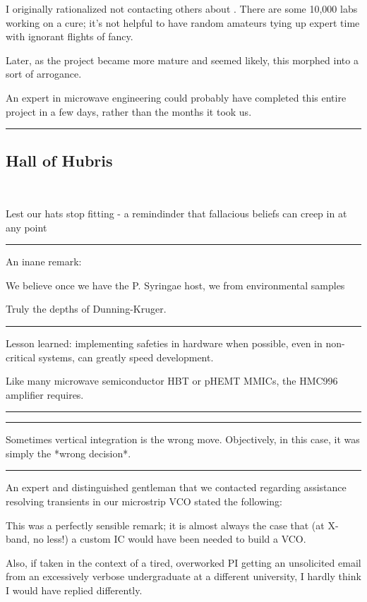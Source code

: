 \documentclass[paper.tex]{subfiles}
\begin{document}
I originally rationalized not contacting others about . There are some 10,000 labs working on a cure; it's not helpful to have random amateurs tying up expert time with ignorant flights of fancy. 

Later, as the project became more mature and seemed likely, this morphed into a sort of arrogance.

An expert in microwave engineering could probably have completed this entire project in a few days, rather than the months it took us.

\rule{\linewidth}{0.2pt}

\subsection{Hall of Hubris} \

Lest our hats stop fitting - a remindinder that fallacious beliefs can creep in at any point

\rule{\linewidth}{0.2pt}

An inane remark:

\begin{displayquote}
We believe once we have the P. Syringae host, we from environmental samples
\end{displayquote}

Truly the depths of Dunning-Kruger.

\rule{\linewidth}{0.2pt}


Lesson learned: implementing safeties in hardware when possible, even in non-critical systems, can greatly speed development.

Like many microwave semiconductor HBT or pHEMT MMICs, the HMC996 amplifier requires.

\rule{\linewidth}{0.2pt}


\rule{\linewidth}{0.2pt}

Sometimes vertical integration is the wrong move. Objectively, in this case, it was simply the *wrong decision*. 

\rule{\linewidth}{0.2pt}


An expert and distinguished gentleman that we contacted regarding assistance resolving transients in our microstrip VCO stated the following:



This was a perfectly sensible remark; it is almost always the case that (at X-band, no less!) a custom IC would have been needed to build a VCO.

Also, if taken in the context of a tired, overworked PI getting an unsolicited email from an excessively verbose undergraduate at a different university, I hardly think I would have replied differently.
\end{document}
